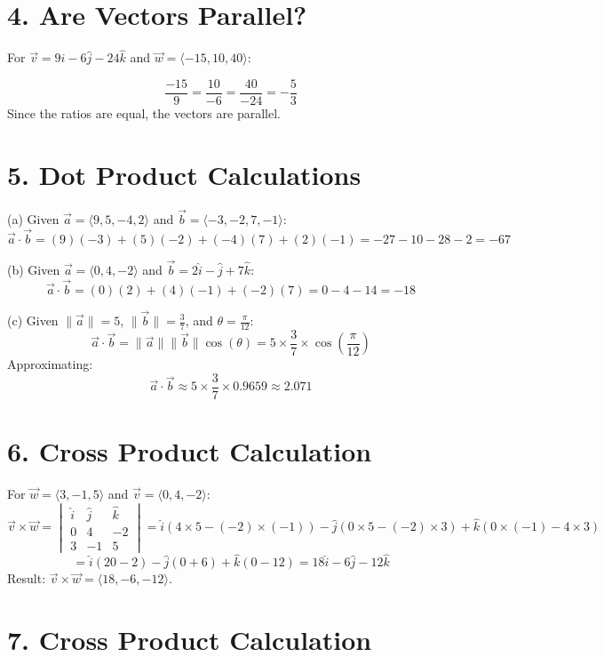 \documentclass[11pt]{article}
\begin{document}
\section*{4. Are Vectors Parallel?}

For $\vec{v} = 9\hat{i} - 6\hat{j} - 24\hat{k}$ and $\vec{w} = \langle -15, 10, 40 \rangle$:

\[
\frac{-15}{9} = \frac{10}{-6} = \frac{40}{-24} = -\frac{5}{3}
\]
Since the ratios are equal, the vectors are parallel.

\section*{5. Dot Product Calculations}

(a) Given $\vec{a} = \langle 9, 5, -4, 2 \rangle$ and $\vec{b} = \langle -3, -2, 7, -1 \rangle$:
\[
\vec{a} \cdot \vec{b} = (9)(-3) + (5)(-2) + (-4)(7) + (2)(-1) = -27 - 10 - 28 - 2 = -67
\]

(b) Given $\vec{a} = \langle 0, 4, -2 \rangle$ and $\vec{b} = 2\hat{i} - \hat{j} + 7\hat{k}$:
\[
\vec{a} \cdot \vec{b} = (0)(2) + (4)(-1) + (-2)(7) = 0 - 4 - 14 = -18
\]

(c) Given $\|\vec{a}\| = 5$, $\|\vec{b}\| = \frac{3}{7}$, and $\theta = \frac{\pi}{12}$:
\[
\vec{a} \cdot \vec{b} = \|\vec{a}\|\|\vec{b}\|\cos(\theta) = 5 \times \frac{3}{7} \times \cos\left(\frac{\pi}{12}\right)
\]
Approximating:
\[
\vec{a} \cdot \vec{b} \approx 5 \times \frac{3}{7} \times 0.9659 \approx 2.071
\]

\section*{6. Cross Product Calculation}

For $\vec{w} = \langle 3, -1, 5 \rangle$ and $\vec{v} = \langle 0, 4, -2 \rangle$:
\[
\vec{v} \times \vec{w} = \begin{vmatrix} \hat{i} & \hat{j} & \hat{k} \\ 0 & 4 & -2 \\ 3 & -1 & 5 \end{vmatrix}
= \hat{i}(4 \times 5 - (-2) \times (-1)) - \hat{j}(0 \times 5 - (-2) \times 3) + \hat{k}(0 \times (-1) - 4 \times 3)
\]
\[
= \hat{i}(20 - 2) - \hat{j}(0 + 6) + \hat{k}(0 - 12) = 18\hat{i} - 6\hat{j} - 12\hat{k}
\]
Result: $\vec{v} \times \vec{w} = \langle 18, -6, -12 \rangle$.

\section*{7. Cross Product Calculation}
\end{document}
